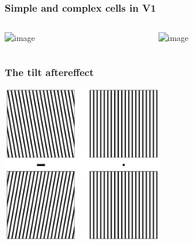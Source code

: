 \documentclass[]{beamer}
\begin{document}
\begin{frame}
 \frametitle{Simple and complex cells in V1}
\begin{overlayarea}{110mm}{70mm}
\begin{columns}[T]
 \begin{column}{55mm}
\begin{center}
\includegraphics<1->[width=50mm]{figs/l3/simple_cell.jpg}
\end{center}
 \end{column}

 \begin{column}{55mm}
\begin{center}
\includegraphics<2->[width=50mm]{figs/l3/complex_cell.jpg}
\end{center}
 \end{column}
\end{columns}

\end{overlayarea}
\end{frame}


\begin{frame}
 \frametitle{The tilt aftereffect}
\begin{center}
\includegraphics[width=70mm]{figs/l3/ori_tilt_aftereffect.png}
\end{center}
\end{frame}
\end{document}
